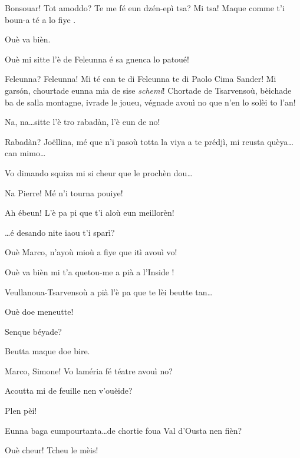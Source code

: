 \begin{drama}

\Cimaspeaks {} Bonsouar! Tot amoddo? Te me fé eun dzén-epì tsa? Mi tsa! Maque comme t'i boun-a té a lo fiye \malisieu .

\Serventaspeaks Ouè va bièn.

\Francescaspeaks  Ouè mi sitte l'è de Feleunna é sa gnenca lo patoué!

\Cimaspeaks Feleunna? Feleunna! Mi té can te di Feleunna te di Paolo Cima Sander! Mi gars\'on, chourtade eunna mia de sise \textit{schemi}! Chortade de Tsarvensoù, bèichade ba de salla montagne, i\-vra\-de le joueu, végnade avouì no que n’en lo solèi to l’an!

\Joellespeaks{} Na, na\ldots sitte l'è tro rabadàn, l'è eun de no!

\Cimaspeaks Rabadàn? Jo\"{e}llina, mé que n'i pasoù totta la viya a te prédjì, mi reusta quèya\ldots can mimo\ldots

\Pierrespeaks{} Vo dimando squiza mi si cheur que le prochèn dou\ldots

\Joelspeaks Na Pierre! Mé n'i tourna  pouiye!


\Joelspeaks{} Ah ébeun! L'è pa pi que t'i aloù eun meillorèn!

\Marcospeaks{} \ldots é desando nite iaou t'i sparì?

\Simonespeaks Ouè Marco, n’ayoù mioù a fiye que itì avouì vo!

\Marcospeaks  Ouè va bièn mi t'a quetou-me a pià a l’Inside \malecha !

\Simonespeaks Veullanoua-Tsarvensoù a pià l'è pa que te lèi beutte tan\ldots

\Marcospeaks Ouè doe meneutte!

\Serventaspeaks Senque béyade?

\Simonespeaks Beutta maque doe bire.

\Pierrespeaks Marco, Simone! Vo laméria fé téatre avouì no?

\Marcospeaks Acoutta mi de feuille nen v'ouèide?

\Joelspeaks Plen pèi!

\Simonespeaks Eunna baga eumpourtanta\ldots de chortie foua Val d'Ousta nen fièn?

\Pierrespeaks Ouè cheur! Tcheu le mèis!


\end{drama}
